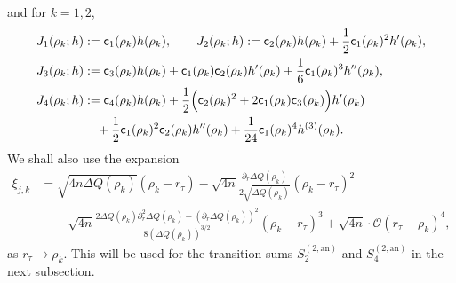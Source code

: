 \documentclass[a4paper]{article}
\numberwithin{equation}{section}
\begin{document}
and for $k=1,2$, 
\begin{align*}
J_1(\rho_k;h)&:=\mathsf{c}_1(\rho_k)h(\rho_k),\qquad
J_2(\rho_k;h):=\mathsf{c}_2(\rho_k)h(\rho_k)+\frac{1}{2}\mathsf{c}_1(\rho_k)^2h'(\rho_k), 
\\
J_3(\rho_k;h)&:=\mathsf{c}_3(\rho_k)h(\rho_k)+
\mathsf{c}_1(\rho_k)\mathsf{c}_2(\rho_k)h'(\rho_k)
+
\frac{1}{6}\mathsf{c}_1(\rho_k)^3h''(\rho_k),
\\
J_4(\rho_k;h)&:=
\mathsf{c}_4(\rho_k)h(\rho_k)+\frac{1}{2}\Bigl(\mathsf{c}_2(\rho_k)^2+2\mathsf{c}_1(\rho_k)\mathsf{c}_3(\rho_k)\Bigr)h'(\rho_k)
\\
&\quad+\frac{1}{2}\mathsf{c}_1(\rho_k)^2\mathsf{c}_2(\rho_k)h''(\rho_k)+\frac{1}{24}\mathsf{c}_1(\rho_k)^4h^{(3)}(\rho_k).
\end{align*}
We shall also use the expansion
\begin{align*}
\xi_{j,k}&=\sqrt{4n\Delta Q(\rho_k)}(\rho_k-r_{\tau})
-\sqrt{4n}\frac{\partial_r \Delta Q(\rho_k)}{2\sqrt{\Delta Q(\rho_k)}}(\rho_k-r_{\tau})^2\\
&\quad +\sqrt{4n}\frac{2\Delta Q(\rho_k)\partial_r^2\Delta Q(\rho_k)-(\partial_r\Delta Q(\rho_k))^2}{8(\Delta Q(\rho_k))^{3/2}}(\rho_k-r_{\tau})^3+\sqrt{4n}\cdot\mathcal{O}(r_{\tau}-\rho_k)^4,
\end{align*}
as $r_\tau\to\rho_k$. This will be used for the transition sums $S_2^{(2,\mathrm{an})}$ and $S_4^{(2,\mathrm{an})}$ in the next subsection.
\end{document}
